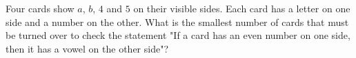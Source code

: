 Four cards show $a$, $b$, $4$ and $5$ on their visible sides. Each card has a letter on one side and a number on the other. What is the smallest number of cards that must be turned over to check the statement "If a card has an even number on one side, then it has a vowel on the other side"?
